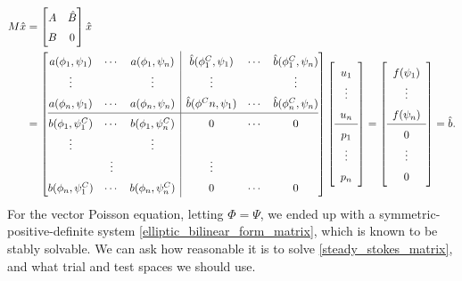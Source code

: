\documentclass[11pt,a4paper]{memoir}
\begin{document}
\begin{equation}\label{steady_stokes_matrix}
\def\arraystretch{1.5}
\begin{split}
    M\hat{x}
    &= \begin{bmatrix}
            A & \hat{B} \\
            B & 0
    \end{bmatrix}\hat{x} \\
    &= \left[\begin{array}{@{}ccc|ccc@{}}
            a(\phi_1, \psi_1) & \cdots & a(\phi_1, \psi_n)     & \hat{b}(\phi^C_1, \psi_1) & \cdots & \hat{b}(\phi^C_1, \psi_n) \\
            \vdots & & \vdots                                  & \vdots & & \vdots \\
            a(\phi_n, \psi_1) & \cdots & a(\phi_n, \psi_n)     & \hat{b}(\phi^Cn, \psi_1) & \cdots & \hat{b}(\phi^C_n, \psi_n) \\
            \hline
            b(\phi_1, \psi^C_1) & \cdots & b(\phi_1, \psi^C_n) & 0 &\cdots& 0      \\
            \vdots & & \vdots \\                               & \vdots & & \vdots \\
            b(\phi_n, \psi^C_1) & \cdots & b(\phi_n, \psi^C_n) & 0 &\cdots& 0       
    \end{array}\right]
    \left[\begin{array}{c} u_1 \\ \vdots \\ u_n \\ \hline p_1 \\ \vdots \\ p_n \end{array}\right]
    =
    \left[\begin{array}{c} f(\psi_1) \\ \vdots \\ f(\psi_{n}) \\ \hline 0 \\ \vdots \\ 0 \end{array}\right]
    = \hat{b}.
\end{split}
\end{equation}
For the vector Poisson equation, letting $\Phi = \Psi$, we ended up with a symmetric-positive-definite system \eqref{elliptic_bilinear_form_matrix}, which is known to be stably solvable.
We can ask how reasonable it is to solve \eqref{steady_stokes_matrix}, and what trial and test spaces we should use.
\end{document}
